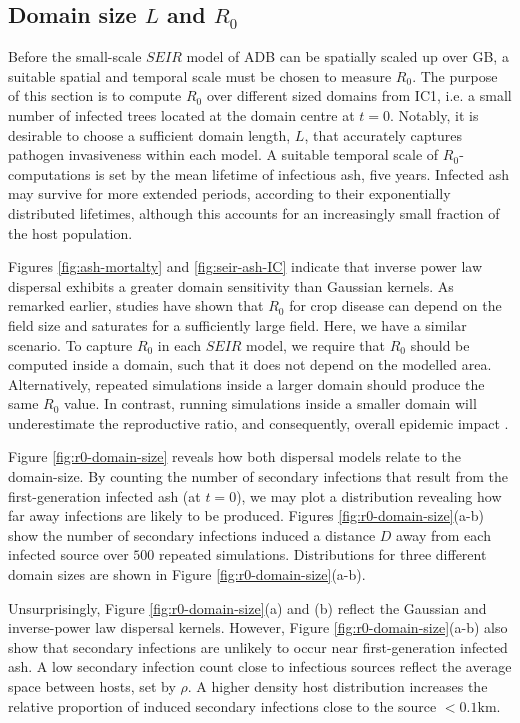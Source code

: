 \subsection{Domain size $L$ and $R_0$}
\label{sec:r0-vs-L}

Before the small-scale $SEIR$ model of ADB can be spatially scaled up over GB, a suitable spatial and temporal scale must be chosen to measure $R_0$.
The purpose of this section is to compute $R_0$ over different sized domains from IC1\textemdash, i.e. a small number of infected trees located at the domain centre at $t=0$.
Notably, it is desirable to choose a sufficient domain length, $L$, that accurately captures pathogen invasiveness within each model.
A suitable temporal scale of $R_0$-computations is set by the mean lifetime of infectious ash, five years.
Infected ash may survive for more extended periods, according to their exponentially distributed lifetimes, although this accounts for an increasingly small fraction of the host population.

Figures \ref{fig:ash-mortalty} and \ref{fig:seir-ash-IC} indicate that inverse power law dispersal exhibits a greater domain sensitivity than Gaussian kernels.
As remarked earlier, studies have shown that $R_0$ for crop disease can depend on the field size \cite{mikaberidze2016invasiveness} and saturates for a sufficiently large field.
Here, we have a similar scenario.
To capture $R_0$ in each $SEIR$ model, we require that $R_0$ should be computed inside a domain, such that it does not depend on the modelled area. 
Alternatively, repeated simulations inside a larger domain should produce the same $R_0$ value.
In contrast, running simulations inside a smaller domain will underestimate the reproductive ratio, and consequently, overall epidemic impact \cite{R0-perc-ref, time-varying-infectivity}.

Figure \ref{fig:r0-domain-size} reveals how both dispersal models relate to the domain-size.
By counting the number of secondary infections that result from the first-generation infected ash (at $t=0$), we may plot a distribution revealing how far away infections are likely to be produced.
Figures \ref{fig:r0-domain-size}(a-b) show the number of secondary infections induced a distance $D$ away from each infected source over $500$ repeated simulations.
Distributions for three different domain sizes are shown in Figure \ref{fig:r0-domain-size}(a-b).

Unsurprisingly, Figure \ref{fig:r0-domain-size}(a) and (b) reflect the Gaussian and inverse-power law dispersal kernels. 
However, Figure \ref{fig:r0-domain-size}(a-b) also show that secondary infections are unlikely to occur near first-generation infected ash.
A low secondary infection count close to infectious sources reflect the average space between hosts, set by $\rho$.
A higher density host distribution increases the relative proportion of induced secondary infections close to the source $<0.1\mathrm{km}$.

